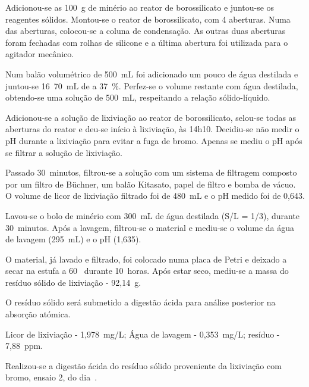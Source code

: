 Adicionou-se as 100~g de minério ao reator de borossilicato e juntou-se os reagentes sólidos. 
Montou-se o reator de borossilicato, com 4 aberturas. 
Numa das aberturas, colocou-se a coluna de condensação.
As outras duas aberturas foram fechadas com rolhas de silicone e a última abertura foi utilizada para o agitador mecânico.

Num balão volumétrico de 500~mL foi adicionado um pouco de água destilada e juntou-se 16~70~mL de \acl{} a 37~\%. Perfez-se o volume restante com água destilada, obtendo-se uma solução de 500~mL, respeitando a relação sólido-líquido.

Adicionou-se a solução de lixiviação ao reator de borossilicato, selou-se todas as aberturas do reator e deu-se início à lixiviação, às 14h10.
Decidiu-se não medir o pH durante a lixiviação para evitar a fuga de bromo. 
Apenas se mediu o pH após se filtrar a solução de lixiviação.


Passado 30~minutos, filtrou-se a solução com um sistema de filtragem composto por um filtro de Büchner, um balão Kitasato, papel de filtro e bomba de vácuo.
O volume de licor de lixiviação filtrado foi de 480~mL e o pH medido foi de 0,643.

Lavou-se o bolo de minério com 300~mL de água destilada (S/L = 1/3), durante 30~minutos.
Após a lavagem, filtrou-se o material e mediu-se o volume da água de lavagem (295~mL) e o pH (1,635).

O material, já lavado e filtrado, foi colocado numa placa de Petri e deixado a secar na estufa a 60~\graus{} durante 10~horas.
Após estar seco, mediu-se a massa do resíduo sólido de lixiviação - 92,14~g.

O resíduo sólido será submetido a digestão ácida para análise posterior na absorção atómica.

 Licor de lixiviação - 1,978~mg/L; Água de lavagem - 0,353~mg/L; resíduo - 7,88~ppm.



Realizou-se a digestão ácida do resíduo sólido proveniente da lixiviação com bromo, ensaio 2, do dia~.

